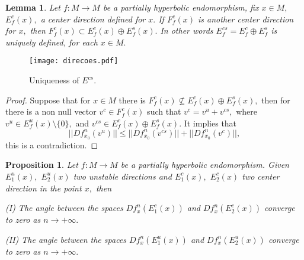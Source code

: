 \documentclass[12pt,reqno]{amsart}
\numberwithin{equation}{section}
\theoremstyle{plain}
\newtheorem{proposition}[theorem]{Proposition}
\newtheorem{lemma}[theorem]{Lemma}
\theoremstyle{remark}
\begin{document}
\begin{lemma}\label{obs 2}
Let $f:M\rightarrow M$ be a partially hyperbolic endomorphism, fix $x\in M,$ $E^c_f(x),$ a center direction defined for $x.$ If $F_f^c(x)$  is another  center direction for $x,$ then
$F_f^c(x)\subset E^c_f(x)\oplus E^s_f(x).$
In other words $E^{cs}_f = E^c_f \oplus E^s_f$ is uniquely defined, for each $x \in M.$
\end{lemma}


\begin{figure}[!htb]
\centering
\texttt{[image: direcoes.pdf]}
\caption{Uniqueness of $E^{cs}.$}\label{fig3}
\end{figure}

\begin{proof}
Suppose that for $x \in M$ there is $F_f^c(x)\nsubseteq E^c_f(x)\oplus E^s_f(x),$ then for there is a non null vector $v^c \in F^c_f(x)$ such that  $v^c = v^u + v^{cs},$ where
$v^u\in E^u_f(x)\setminus\{0\},$ and $v^{cs}\in E^c_f(x)\oplus E^s_f(x).$ It  implies that $$||Df_{x_0}^n(v^u)||\leq ||Df_{x_0}^n(v^{cs})||+||Df^n_{x_0}(v^{c})||,$$ this is a contradiction.

\end{proof}






\begin{proposition}\label{prop angulo-zero}
Let $f:M\rightarrow M$ be a partially hyperbolic endomorphism. Given $E^u_1(x),$ $E^u_2(x)$ two unstable directions and $E^c_1(x),$ $E^c_2(x)$ two center direction in the point $x,$ then

(I) The angle between the spaces $Df^n_x(E^c_1(x))$ and $Df_x^n(E^c_2(x))$ converge to zero as $n\rightarrow +\infty.$

(II) The angle between the spaces  $Df^n_x(E^u_1(x))$ and $Df_x^n(E^u_2(x))$ converge to zero as $n\rightarrow +\infty.$






\end{proposition}
\end{document}
